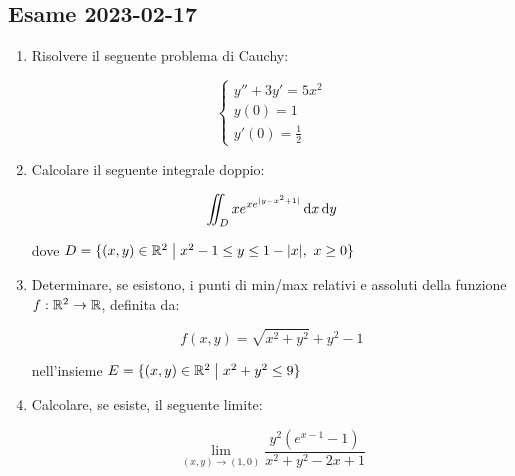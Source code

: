 \subsection{Esame 2023{-}02{-}17}

\begin{enumerate}
    \itemsep32pt
    \item Risolvere il seguente problema di Cauchy:

          \begin{equation*}
              \begin{cases}
                  y'' + 3y' = 5x^{2} \\
                  y(0) = 1           \\[1mm]
                  y'(0) = \frac{1}{2}
              \end{cases}
          \end{equation*}

    \item Calcolare il seguente integrale doppio:

          \[
              \iint_{D} xe^{xe^{|y-x^{2}+1|}} \mathop{}\!\mathrm{d}{x}\mathop{}\!\mathrm{d}{y}
          \]

          dove \(D = \{(x,y) \in \mathbb{R}^{2} \;\big|\; x^2 - 1 \le y \le 1 - |x|,\ x \ge 0\} \)

    \item Determinare, se esistono, i punti di min/max relativi e assoluti della funzione \(f: \mathbb{R}^{2} \rightarrow \mathbb{R} \), definita da:

          \[
              f(x,y) = \sqrt{x^2 + y^2} + y^2 - 1
          \]

          nell'insieme \(E = \{(x,y) \in \mathbb{R}^2 \;\big|\; x^2 + y^2 \le 9 \} \)


    \item Calcolare, se esiste, il seguente limite:

          \[
              \lim_{(x,y) \rightarrow (1,0)}
              \frac
              {y^2(e^{x-1} -1)}
              {x^2 + y^2 -2x+1}
          \]

\end{enumerate}
